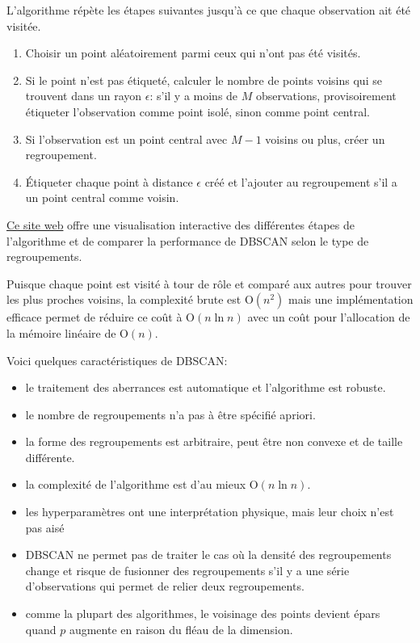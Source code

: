 \documentclass[
  11pt,
  letterpaper,
]{scrbook}
\providecommand{\tightlist}{%
  \setlength{\itemsep}{0pt}\setlength{\parskip}{0pt}}\usepackage{longtable,booktabs,array}
\theoremstyle{definition}
\theoremstyle{remark}
\begin{document}
L'algorithme répète les étapes suivantes jusqu'à ce que chaque
observation ait été visitée.

\begin{enumerate}
\def\labelenumi{\arabic{enumi}.}
\tightlist
\item
  Choisir un point aléatoirement parmi ceux qui n'ont pas été visités.
\item
  Si le point n'est pas étiqueté, calculer le nombre de points voisins
  qui se trouvent dans un rayon \(\epsilon\): s'il y a moins de \(M\)
  observations, provisoirement étiqueter l'observation comme point
  isolé, sinon comme point central.
\item
  Si l'observation est un point central avec \(M-1\) voisins ou plus,
  créer un regroupement.
\item
  Étiqueter chaque point à distance \(\epsilon\) créé et l'ajouter au
  regroupement s'il a un point central comme voisin.
\end{enumerate}

\href{https://www.naftaliharris.com/blog/visualizing-dbscan-clustering/}{Ce
site web} offre une visualisation interactive des différentes étapes de
l'algorithme et de comparer la performance de DBSCAN selon le type de
regroupements.

Puisque chaque point est visité à tour de rôle et comparé aux autres
pour trouver les plus proches voisins, la complexité brute est
\(\mathrm{O}(n^2)\) mais une implémentation efficace permet de réduire
ce coût à \(\mathrm{O}(n\ln n)\) avec un coût pour l'allocation de la
mémoire linéaire de \(\mathrm{O}(n)\).

Voici quelques caractéristiques de DBSCAN:

\begin{itemize}
\tightlist
\item
  le traitement des aberrances est automatique et l'algorithme est
  robuste.
\item
  le nombre de regroupements n'a pas à être spécifié apriori.
\item
  la forme des regroupements est arbitraire, peut être non convexe et de
  taille différente.
\item
  la complexité de l'algorithme est d'au mieux \(\mathrm{O}(n\ln n)\).
\item
  les hyperparamètres ont une interprétation physique, mais leur choix
  n'est pas aisé
\item
  DBSCAN ne permet pas de traiter le cas où la densité des regroupements
  change et risque de fusionner des regroupements s'il y a une série
  d'observations qui permet de relier deux regroupements.
\item
  comme la plupart des algorithmes, le voisinage des points devient
  épars quand \(p\) augmente en raison du fléau de la dimension.
\end{itemize}
\end{document}
